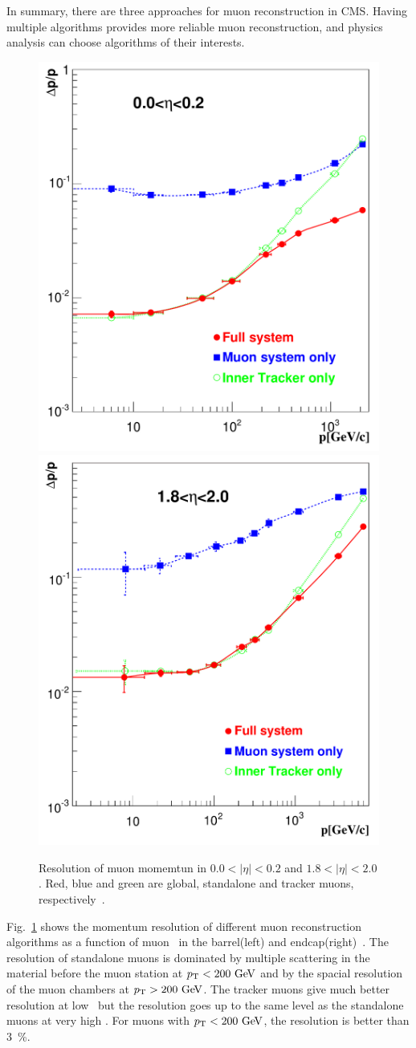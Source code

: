 In summary, there are three approaches for muon reconstruction in CMS. 
Having multiple algorithms provides more reliable muon reconstruction, 
and physics analysis can choose algorithms of their interests. 
\begin{figure}[!hbtp]
\centering
\includegraphics[width=.45\textwidth]{figures/Figure_001-005-a.pdf}
\includegraphics[width=.45\textwidth]{figures/Figure_001-005-b.pdf}
\caption{Resolution of muon momemtun in $0.0<|\eta|<0.2$ and $1.8<|\eta|<2.0$. 
Red, blue and green are global, standalone and tracker muons, 
respectively~\cite{cmstdr1}.} 
\label{fig:muon_res}
\end{figure}
Fig.~\ref{fig:muon_res} shows the momentum resolution of different muon 
reconstruction algorithms as a function of muon \pt\ 
in the barrel(left) and endcap(right)~\cite{cmstdr1}. 
The resolution of standalone muons is dominated by multiple scattering in the material 
before the muon station at $p_\mathrm{T}<200~\mathrm{Ge\kern -0.1em V}$  and by the spacial resolution 
of the muon chambers at $p_\mathrm{T}>200~\mathrm{Ge\kern -0.1em V}$. The tracker muons give much better 
resolution at low \pt\, but the resolution goes up to the same level 
as the standalone muons at very high \pt. For muons with $p_\mathrm{T}<200~\mathrm{Ge\kern -0.1em V}$, 
the resolution is better than 3~\%.

